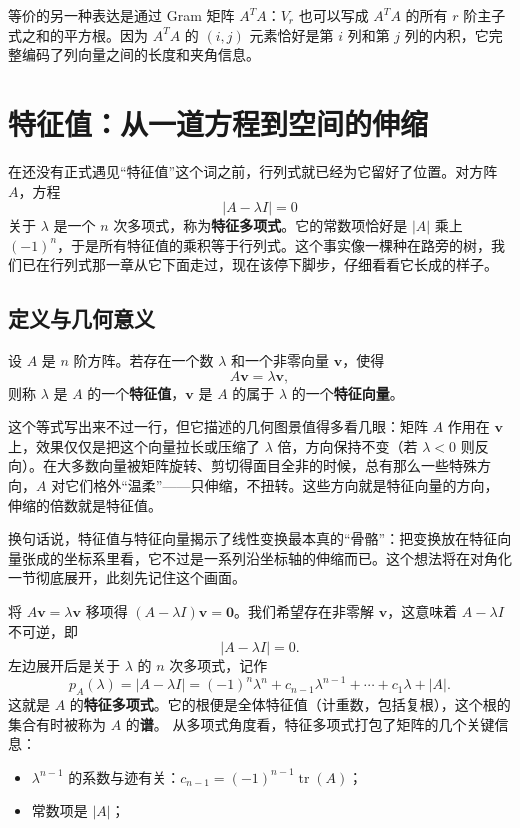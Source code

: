 \documentclass[UTF8]{ctexbook}
\begin{document}
等价的另一种表达是通过 Gram 矩阵 $A^TA$：$V_r$ 也可以写成 $A^TA$ 的所有 $r$ 阶主子式之和的平方根。因为 $A^TA$ 的 $(i,j)$ 元素恰好是第 $i$ 列和第 $j$ 列的内积，它完整编码了列向量之间的长度和夹角信息。

\newpage

\section{特征值：从一道方程到空间的伸缩}

在还没有正式遇见“特征值”这个词之前，行列式就已经为它留好了位置。对方阵 $A$，方程
\[
|A-\lambda I|=0
\]
关于 $\lambda$ 是一个 $n$ 次多项式，称为\textbf{特征多项式}。它的常数项恰好是 $|A|$ 乘上 $(-1)^n$，于是所有特征值的乘积等于行列式。这个事实像一棵种在路旁的树，我们已在行列式那一章从它下面走过，现在该停下脚步，仔细看看它长成的样子。

\subsection{定义与几何意义}

设 $A$ 是 $n$ 阶方阵。若存在一个数 $\lambda$ 和一个非零向量 $\mathbf{v}$，使得
\[
A\mathbf{v}=\lambda\mathbf{v},
\]
则称 $\lambda$ 是 $A$ 的一个\textbf{特征值}，$\mathbf{v}$ 是 $A$ 的属于 $\lambda$ 的一个\textbf{特征向量}。

这个等式写出来不过一行，但它描述的几何图景值得多看几眼：矩阵 $A$ 作用在 $\mathbf{v}$ 上，效果仅仅是把这个向量拉长或压缩了 $\lambda$ 倍，方向保持不变（若 $\lambda<0$ 则反向）。在大多数向量被矩阵旋转、剪切得面目全非的时候，总有那么一些特殊方向，$A$ 对它们格外“温柔”——只伸缩，不扭转。这些方向就是特征向量的方向，伸缩的倍数就是特征值。

换句话说，特征值与特征向量揭示了线性变换最本真的“骨骼”：把变换放在特征向量张成的坐标系里看，它不过是一系列沿坐标轴的伸缩而已。这个想法将在对角化一节彻底展开，此刻先记住这个画面。

将 $A\mathbf{v}=\lambda\mathbf{v}$ 移项得 $(A-\lambda I)\mathbf{v}=\mathbf{0}$。我们希望存在非零解 $\mathbf{v}$，这意味着 $A-\lambda I$ 不可逆，即
\[
|A-\lambda I|=0.
\]
左边展开后是关于 $\lambda$ 的 $n$ 次多项式，记作
\[
p_A(\lambda)=|A-\lambda I|=(-1)^n\lambda^n+c_{n-1}\lambda^{n-1}+\cdots+c_1\lambda+|A|.
\]
这就是 $A$ 的\textbf{特征多项式}。它的根便是全体特征值（计重数，包括复根），这个根的集合有时被称为 $A$ 的\textbf{谱}。
从多项式角度看，特征多项式打包了矩阵的几个关键信息：
\begin{itemize}
    \item $\lambda^{n-1}$ 的系数与迹有关：$c_{n-1}=(-1)^{n-1}\operatorname{tr}(A)$；
    \item 常数项是 $|A|$；
\end{itemize}
\end{document}
